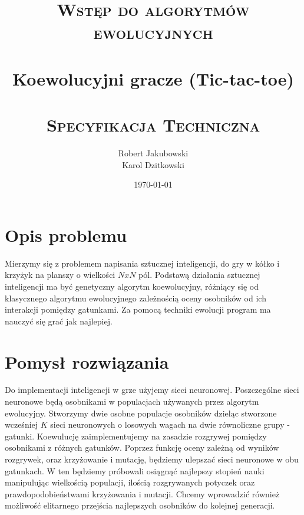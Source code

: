 \documentclass[paper=a4, fontsize=11pt]{scrartcl} %
\title{
\vspace*{\fill}
\normalfont
\textsc{Wstęp do algorytmów ewolucyjnych}\\ [20pt]
\horrule{1.5pt} \\[0.4cm] %
\LARGE Koewolucyjni gracze (Tic-tac-toe)\\ %
\horrule{1.5pt} \\[0.1cm] %
\normalsize
\textsc{Specyfikacja Techniczna} \\ [20pt]
\vspace*{\fill}
}
\author{Robert Jakubowski \\Karol Dzitkowski} %
\date{\normalsize\today} %
\numberwithin{equation}{section} %
\numberwithin{figure}{section} %
\numberwithin{table}{section} %
\begin{document}
\maketitle

\thispagestyle{empty}
\clearpage

\tableofcontents

\clearpage

\section{Opis problemu}
Mierzymy się z problemem napisania sztucznej inteligencji, do gry w kółko i krzyżyk na planszy o wielkości $NxN$ pól.
Podstawą działania sztucznej inteligencji ma być genetyczny algorytm koewolucyjny, różniący się od klasycznego algorytmu ewolucyjnego zależnością oceny osobników od ich interakcji pomiędzy gatunkami. Za pomocą techniki ewolucji program ma nauczyć się grać jak najlepiej. 
\section{Pomysł rozwiązania}
Do implementacji inteligencji w grze użyjemy sieci neuronowej. Poszczególne sieci neuronowe będą osobnikami w populacjach używanych przez algorytm ewolucyjny. Stworzymy dwie osobne populacje osobników dzieląc stworzone wcześniej $K$ sieci neuronowych o losowych wagach na dwie równoliczne grupy - gatunki. Koewulucję zaimplementujemy na zasadzie rozgrywej pomiędzy osobnikami z różnych gatunków. Poprzez funkcję oceny zależną od wyników rozgrywek, oraz krzyżowanie i mutację, będziemy ulepszać sieci neuronowe w obu gatunkach. W ten będziemy próbowali osiągnąć najlepszy stopień nauki manipulując wielkością populacji, ilością rozgrywanych potyczek oraz prawdopodobieństwami krzyżowania i mutacji. Chcemy wprowadzić również możliwość elitarnego przejścia najlepszych osobników do kolejnej generacji.
\end{document}

